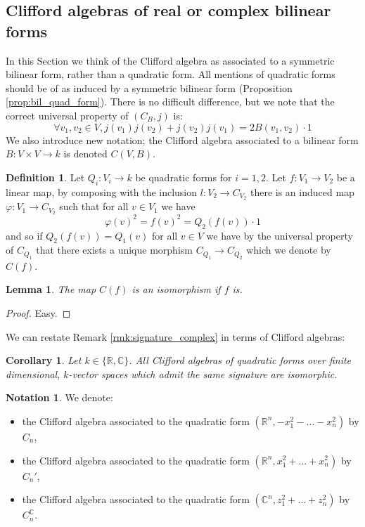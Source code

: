 \documentclass[12pt]{article}
\theoremstyle{plain}
\newtheorem{lemma}[thm]{Lemma}
\newtheorem{cor}[thm]{Corollary}
\theoremstyle{definition}
\newtheorem{defn}[thm]{Definition} %
\newtheorem{notation}[thm]{Notation}
\newcommand{\bb}[1]{\mathbb{#1}}
\newcommand{\lto}{\longrightarrow}
\begin{document}
\subsection{Clifford algebras of real or complex bilinear forms}
In this Section we think of the Clifford algebra as associated to a symmetric bilinear form, rather than a quadratic form.  All mentions of quadratic forms should be of as induced by a symmetric bilinear form (Proposition \ref{prop:bil_quad_form}). There is no difficult difference, but we note that the correct universal property of $(C_B,j)$ is:
\begin{equation}
\forall v_1,v_2 \in V, j(v_1)j(v_2) + j(v_2)j(v_1) = 2B(v_1,v_2)\cdot 1
\end{equation}
We also introduce new notation; the Clifford algebra associated to a bilinear form $B: V \times V \lto k$ is denoted $C(V,B)$.
\begin{defn}
Let $Q_i: V_i \lto k$ be quadratic forms for $i = 1,2$. Let $f: V_1 \lto V_2$ be a linear map, by composing with the inclusion $l: V_2 \lto C_{V_2}$ there is an induced map $\varphi: V_1 \lto C_{V_2}$ such that for all $v \in V_1$ we have
\begin{equation}
\varphi(v)^2 = f(v)^2 = Q_2(f(v))\cdot 1
\end{equation}
and so if $Q_2(f(v)) = Q_1(v)$ for all $v \in V$ we have by the universal property of $C_{Q_1}$ that there exists a unique morphism $C_{Q_1} \lto C_{Q_2}$ which we denote by $C(f)$.
\end{defn}
\begin{lemma}
The map $C(f)$ is an isomorphism if $f$ is.
\end{lemma}
\begin{proof}
Easy.
\end{proof}
We can restate Remark \ref{rmk:signature_complex} in terms of Clifford algebras:
\begin{cor}\label{cor:signature_determines}
Let $k\in \lbrace \bb{R},\bb{C}\rbrace$. All Clifford algebras of quadratic forms over finite dimensional, $k$-vector spaces which admit the same signature are isomorphic.
\end{cor}
\begin{notation}
We denote:
\begin{itemize}
\item the Clifford algebra associated to the quadratic form $(\bb{R}^n, -x_1^2 - \hdots - x_n^2)$ by $C_n$,
\item the Clifford algebra associated to the quadratic form $(\bb{R}^n, x_1^2 + \hdots + x_n^2)$ by $C_n'$,
\item the Clifford algebra associated to the quadratic form $(\bb{C}^n, z_1^2 + \hdots + z_n^2)$ by $C_n^{\bb{C}}$.
\end{itemize}
\end{notation}
\end{document}
